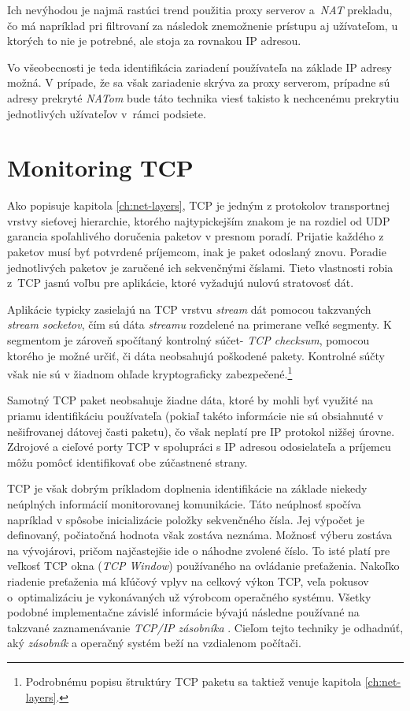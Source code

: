 \documentclass[
  printed, %
  table,   %
  lof,     %
  nolot,   %
  nocover
]{fithesis3}
\begin{document}
Ich nevýhodou je najmä rastúci trend použitia proxy serverov a~\textit{NAT}
prekladu, čo má napríklad pri filtrovaní za následok znemožnenie prístupu aj
užívateľom, u ktorých to nie je potrebné, ale stoja za rovnakou IP adresou.

Vo všeobecnosti je teda identifikácia zariadení používateľa na základe IP
adresy možná. V prípade, že sa však zariadenie skrýva za proxy serverom,
prípadne sú adresy prekryté \textit{NATom} bude táto technika viesť takisto k
nechcenému prekrytiu jednotlivých užívateľov v~rámci podsiete.

\section{Monitoring TCP}
Ako popisuje kapitola \ref{ch:net-layers}, TCP
je jedným z protokolov transportnej
vrstvy sieťovej hierarchie, ktorého najtypickejším znakom je na rozdiel
od UDP garancia spoľahlivého doručenia paketov v presnom poradí. Prijatie
každého z paketov musí byť potvrdené príjemcom, inak je paket odoslaný znovu.
Poradie jednotlivých paketov je zaručené ich sekvenčnými číslami. Tieto 
vlastnosti robia z~TCP jasnú voľbu pre aplikácie, ktoré vyžadujú nulovú
stratovosť dát. 

Aplikácie typicky zasielajú na TCP vrstvu \textit{stream} dát
pomocou takzvaných \textit{stream socketov}, čím sú dáta \textit{streamu}
rozdelené na primerane veľké segmenty. K segmentom je zároveň spočítaný
kontrolný súčet- \textit{TCP checksum}, pomocou ktorého je možné určiť, či
dáta neobsahujú poškodené pakety. Kontrolné súčty však nie sú v žiadnom ohľade
kryptograficky zabezpečené.\footnote{Podrobnému popisu štruktúry TCP paketu sa
taktiež venuje kapitola \ref{ch:net-layers}.}

Samotný TCP paket neobsahuje žiadne dáta, ktoré by mohli byť využité na priamu
identifikáciu používateľa (pokiaľ takéto informácie nie sú obsiahnuté v
nešifrovanej dátovej časti paketu), čo však neplatí pre IP protokol nižšej
úrovne. Zdrojové a cieľové porty TCP v spolupráci s IP adresou odosielateľa a
príjemcu môžu pomôcť identifikovať obe zúčastnené strany.

TCP je však dobrým príkladom doplnenia identifikácie na základe niekedy neúplných
informácií monitorovanej komunikácie. Táto neúplnosť spočíva napríklad v
spôsobe inicializácie položky sekvenčného čísla. Jej výpočet je definovaný,
počiatočná hodnota však zostáva neznáma. Možnosť výberu zostáva na vývojárovi,
pričom najčastejšie ide o náhodne zvolené číslo. To isté platí pre veľkosť TCP
okna (\textit{TCP Window}) používaného na ovládanie preťaženia. Nakoľko
riadenie preťaženia má kľúčový vplyv na celkový výkon TCP, veľa pokusov
o~optimalizáciu je vykonávaných už výrobcom operačného systému.
Všetky podobné implementačne závislé informácie bývajú následne používané na takzvané
zaznamenávanie \textit{TCP/IP zásobníka} \cite{FIDIS:TCP}. Cieľom tejto techniky je odhadnúť,
aký \textit{zásobník} a operačný systém beží na vzdialenom počítači.
\end{document}
